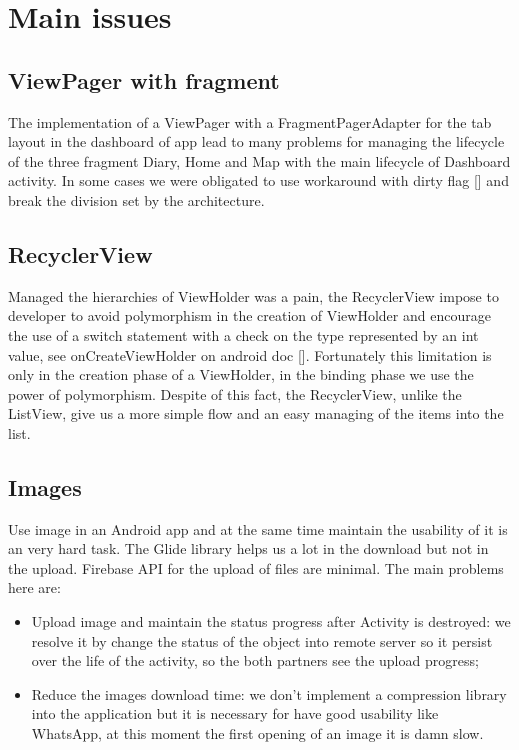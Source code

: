 
\section{Main issues}
\label{sec:issues} 

\subsection{ViewPager with fragment}
The implementation of a ViewPager with a FragmentPagerAdapter for the tab layout in the dashboard of app lead to many problems for managing the lifecycle of the three fragment Diary, Home and Map with the main lifecycle of Dashboard activity.
In some cases we were obligated to use workaround with dirty flag [] and break the division set by the architecture.

\subsection{RecyclerView}
Managed the hierarchies of ViewHolder was a pain, the RecyclerView impose to developer to avoid polymorphism in the creation of ViewHolder and encourage the use of a switch statement with a check on the type represented by an int value, see onCreateViewHolder on android doc []. Fortunately this limitation is only in the creation phase of a ViewHolder, in the binding phase we use the power of polymorphism. Despite of this fact, the RecyclerView, unlike the ListView, give us a more simple flow and an easy managing of the items into the list.

\subsection{Images}
Use image in an Android app and at the same time maintain the usability of it is an very hard task. The Glide library helps us a lot in the download but not in the upload. Firebase API for the upload of files are minimal. The main problems here are:
\begin{itemize}
	\item Upload image and maintain the status progress after Activity is destroyed: we resolve it by change the status of the object into remote server so it persist over the life of the activity, so the both partners see the upload progress;
	\item Reduce the images download time: we don't implement a compression library into the application but it is necessary for have good usability like WhatsApp, at this moment the first opening of an image it is damn slow.
\end{itemize}

